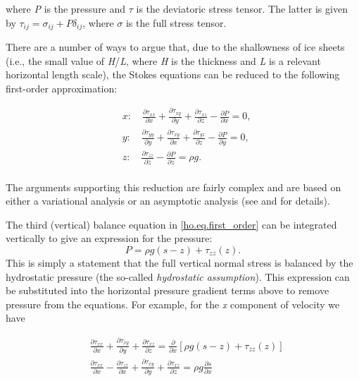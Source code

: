 \noindent
where \textit{P} is the pressure and {\large \(\tau{}\)} is the deviatoric stress tensor. The latter is given by $\tau _{ij}=\sigma _{ij}+P\delta _{ij}$, 
where {\large \(\sigma{}\)} is the full stress tensor.

There are a number of ways to argue that, due to the shallowness of ice sheets (i.e., the small value of \textit{H}/\textit{L}, where \textit{H} is the thickness and \textit{L} is a relevant horizontal length scale), the Stokes equations can be reduced to the following first-order approximation:

\begin{equation}
  \label{ho.eq.first_order}
  \begin{split}
    & x:\quad \frac{\partial \tau _{xx}}{\partial x} + \frac{\partial \tau _{xy}}{\partial y} + \frac{\partial \tau _{xz}}{\partial z} - \frac{\partial P}{\partial x} = 0, \\ 
    & y:\quad \frac{\partial \tau _{yy}}{\partial y} + \frac{\partial \tau _{xy}}{\partial x} + \frac{\partial \tau _{yz}}{\partial z} - \frac{\partial P}{\partial y} = 0, \\ 
    & z:\quad \frac{\partial \tau _{zz}}{\partial z} - \frac{\partial P}{\partial z} = \rho g. \\ 
  \end{split}
\end{equation}

\noindent
The arguments supporting this reduction are fairly complex and are based on either a variational analysis or an asymptotic analysis (see \citet{Schoof:2010dl} and \citet{DUKOWICZ:2010wb} for details).

The third (vertical) balance equation in \eqref{ho.eq.first_order} can be integrated vertically to give an expression for the pressure:
\begin{equation}
P = \rho g\left( s-z \right) + \tau _{zz}(z).
\end{equation} 
This is simply a statement that the full vertical normal stress is balanced by the hydrostatic pressure (the so-called \textit{hydrostatic assumption}). This expression can be substituted into the horizontal pressure gradient terms above to remove pressure from the equations. For example, for the \textit{x} component of velocity we have

\begin{equation}
  \label{ho.eq.x_stress_balance}
  \begin{split}
    & \frac{\partial \tau _{xx}}{\partial x} + \frac{\partial \tau _{xy}}{\partial y} + \frac{\partial \tau _{xz}}{\partial z} = \frac{\partial }{\partial x}\left[ \rho g\left( s-z \right)+\tau _{zz}(z) \right] \\ 
    & \frac{\partial \tau _{xx}}{\partial x} - \frac{\partial \tau _{zz}}{\partial x} + \frac{\partial \tau _{xy}}{\partial y} + \frac{\partial \tau _{xz}}{\partial z} = \rho g\frac{\partial s}{\partial x} \\ 
  \end{split}
\end{equation}

